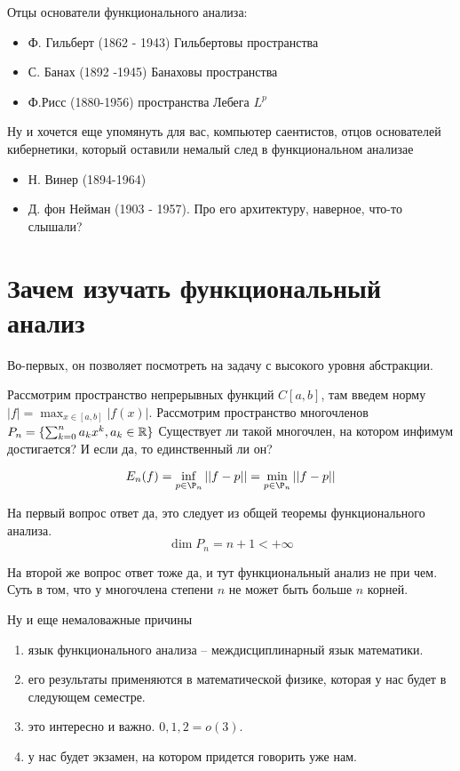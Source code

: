 \documentclass[document]{subfiles}
\begin{document}
Отцы основатели функционального анализа:
\begin{itemize}
    \item Ф. Гильберт (1862 - 1943) Гильбертовы пространства
    \item С. Банах (1892 -1945) Банаховы пространства
    \item Ф.Рисс (1880-1956) пространства Лебега $L^p$
\end{itemize}
Ну и хочется еще упомянуть для вас, компьютер саентистов, отцов основателей кибернетики, который оставили немалый след в функциональном анализае
\begin{itemize}
    \item Н. Винер (1894-1964)
    \item Д. фон Нейман (1903 - 1957). Про его архитектуру, наверное, что-то слышали?
\end{itemize}

\section{Зачем изучать функциональный анализ}
Во-первых, он позволяет посмотреть на задачу с высокого уровня абстракции.

Рассмотрим пространство непрерывных функций $C[a,b]$, там введем норму $|f| = \max_{x \in [a,b]} | f(x)|. $ Рассмотрим пространство многочленов $P_n = \{ \sum^n_{k=0} a_kx^k, a_k \in \mathbb{R} \}$
Существует ли такой многочлен, на котором инфимум достигается? И если да, то единственный ли он? 

\[ E_n (f) = \inf_{p \in \P_n} || f - p||  = \min_{p \in \P_n} ||f - p|| \]


На первый вопрос ответ да, это следует из общей теоремы функционального анализа. 
\[ \dim P_n = n + 1 < + \infty \]

На второй же вопрос ответ тоже да, и тут функциональный анализ не при чем. Суть в том, что у многочлена степени $n$ не может быть больше $n$ корней.

Ну и еще немаловажные причины
\begin{enumerate}
    \item язык функционального анализа -- междисциплинарный язык математики.
    \item его результаты применяются в математической физике, которая у нас будет в следующем семестре.
    \item это интересно и важно.  $0,1,2 = o(3)$.
    \item у нас будет экзамен, на котором придется говорить уже нам.
\end{enumerate}
\end{document}
